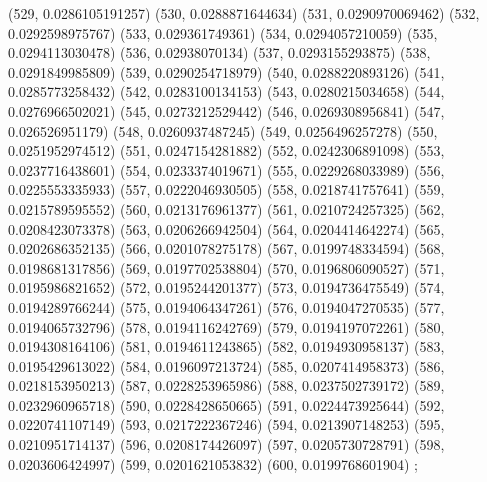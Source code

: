 {					(529, 0.0286105191257)
					(530, 0.0288871644634)
					(531, 0.0290970069462)
					(532, 0.0292598975767)
					(533, 0.029361749361)
					(534, 0.0294057210059)
					(535, 0.0294113030478)
					(536, 0.02938070134)
					(537, 0.0293155293875)
					(538, 0.0291849985809)
					(539, 0.0290254718979)
					(540, 0.0288220893126)
					(541, 0.0285773258432)
					(542, 0.0283100134153)
					(543, 0.0280215034658)
					(544, 0.0276966502021)
					(545, 0.0273212529442)
					(546, 0.0269308956841)
					(547, 0.026526951179)
					(548, 0.0260937487245)
					(549, 0.0256496257278)
					(550, 0.0251952974512)
					(551, 0.0247154281882)
					(552, 0.0242306891098)
					(553, 0.0237716438601)
					(554, 0.0233374019671)
					(555, 0.0229268033989)
					(556, 0.0225553335933)
					(557, 0.0222046930505)
					(558, 0.0218741757641)
					(559, 0.0215789595552)
					(560, 0.0213176961377)
					(561, 0.0210724257325)
					(562, 0.0208423073378)
					(563, 0.0206266942504)
					(564, 0.0204414642274)
					(565, 0.0202686352135)
					(566, 0.0201078275178)
					(567, 0.0199748334594)
					(568, 0.0198681317856)
					(569, 0.0197702538804)
					(570, 0.0196806090527)
					(571, 0.0195986821652)
					(572, 0.0195244201377)
					(573, 0.0194736475549)
					(574, 0.0194289766244)
					(575, 0.0194064347261)
					(576, 0.0194047270535)
					(577, 0.0194065732796)
					(578, 0.0194116242769)
					(579, 0.0194197072261)
					(580, 0.0194308164106)
					(581, 0.0194611243865)
					(582, 0.0194930958137)
					(583, 0.0195429613022)
					(584, 0.0196097213724)
					(585, 0.0207414958373)
					(586, 0.0218153950213)
					(587, 0.0228253965986)
					(588, 0.0237502739172)
					(589, 0.0232960965718)
					(590, 0.0228428650665)
					(591, 0.0224473925644)
					(592, 0.0220741107149)
					(593, 0.0217222367246)
					(594, 0.0213907148253)
					(595, 0.0210951714137)
					(596, 0.0208174426097)
					(597, 0.0205730728791)
					(598, 0.0203606424997)
					(599, 0.0201621053832)
					(600, 0.0199768601904)
				};
